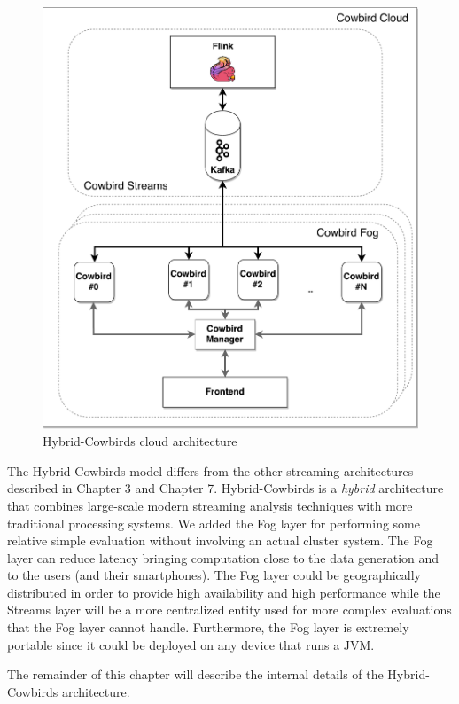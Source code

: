  \begin{figure}[h!]
\includegraphics[width=1\textwidth]{images/cowbird_distributed.pdf}
 \caption{Hybrid-Cowbirds cloud architecture}
\label{fig:distributed_cowbirds}
\end{figure}

The Hybrid-Cowbirds model differs from the other streaming architectures described in Chapter 3 and Chapter 7. Hybrid-Cowbirds is a \emph{hybrid} architecture that combines large-scale modern streaming analysis techniques with more traditional processing systems. We added the Fog layer for performing some relative simple evaluation without involving an actual cluster system. The Fog layer can reduce latency bringing computation close to the data generation and to the users (and their smartphones). The Fog layer could be geographically distributed in order to provide high availability and high performance while the Streams layer will be a more centralized entity used for more complex evaluations that the Fog layer cannot handle. Furthermore, the Fog layer is extremely portable since it could be deployed on any device that runs a JVM. 

The remainder of this chapter will describe the internal details of the Hybrid-Cowbirds architecture. 

